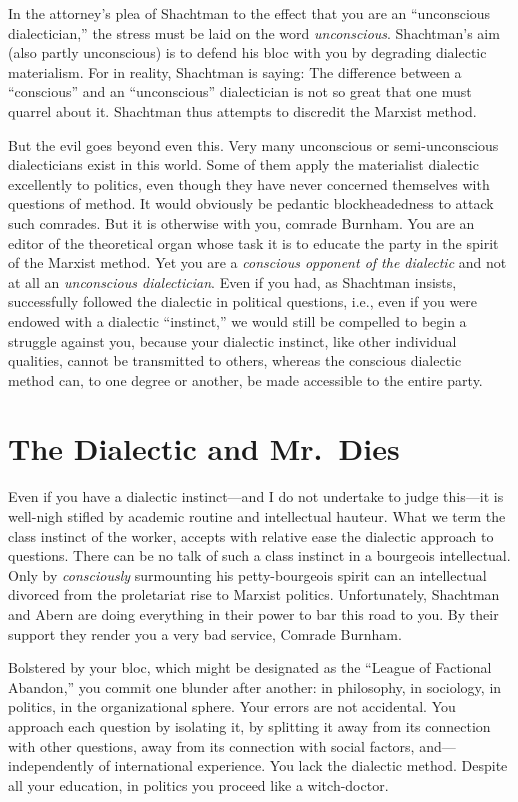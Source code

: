 In the attorney’s plea of Shachtman to the effect that you are an “unconscious dialectician,” the stress must be laid on the word \emph{unconscious}. Shachtman’s aim (also partly unconscious) is to defend his bloc with you by degrading dialectic materialism. For in reality, Shachtman is saying: The difference between a “conscious” and an “unconscious” dialectician is not so great that one must quarrel about it. Shachtman thus attempts to discredit the Marxist method.

But the evil goes beyond even this. Very many unconscious or semi-unconscious dialecticians exist in this world. Some of them apply the materialist dialectic excellently to politics, even though they have never concerned themselves with questions of method. It would obviously be pedantic blockheadedness to attack such comrades. But it is otherwise with you, comrade Burnham. You are an editor of the theoretical organ whose task it is to educate the party in the spirit of the Marxist method. Yet you are a \emph{conscious opponent of the dialectic} and not at all an \emph{unconscious dialectician}. Even if you had, as Shachtman insists, successfully followed the dialectic in political questions, i.e., even if you were endowed with a dialectic “instinct,” we would still be compelled to begin a struggle against you, because your dialectic instinct, like other individual qualities, cannot be transmitted to others, whereas the conscious dialectic method can, to one degree or another, be made accessible to the entire party.

\section*{The Dialectic and Mr.\ Dies}

Even if you have a dialectic instinct---and I do not undertake to judge this---it is well-nigh stifled by academic routine and intellectual hauteur. What we term the class instinct of the worker, accepts with relative ease the dialectic approach to questions. There can be no talk of such a class instinct in a bourgeois intellectual. Only by \emph{consciously} surmounting his petty-bourgeois spirit can an intellectual divorced from the proletariat rise to Marxist politics. Unfortunately, Shachtman and Abern are doing everything in their power to bar this road to you. By their support they render you a very bad service, Comrade Burnham.

Bolstered by your bloc, which might be designated as the “League of Factional Abandon,” you commit one blunder after another: in philosophy, in sociology, in politics, in the organizational sphere. Your errors are not accidental. You approach each question by isolating it, by splitting it away from its connection with other questions, away from its connection with social factors, and---independently of international experience. You lack the dialectic method. Despite all your education, in politics you proceed like a witch-doctor.

